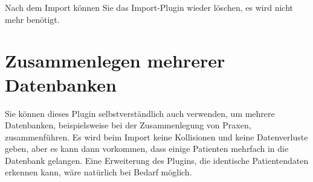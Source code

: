 \documentclass[a4paper]{scrartcl}
\begin{document}
\bigskip

Nach dem Import können Sie das Import-Plugin wieder löschen, es wird nicht mehr benötigt.

\section{Zusammenlegen mehrerer Datenbanken}
Sie können dieses Plugin selbstverständlich auch verwenden, um mehrere Datenbanken, beispielsweise bei der Zusammenlegung von Praxen, zusammenführen. Es wird beim Import keine Kollisionen und keine Datenverluste geben, aber es kann dann vorkommen, dass einige Patienten mehrfach in die Datenbank gelangen. Eine Erweiterung des Plugins, die identische Patientendaten erkennen kann, wäre natürlich bei Bedarf möglich.
\end{document}
